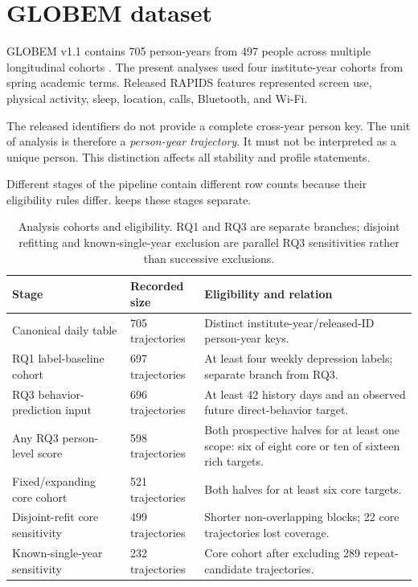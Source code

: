 \documentclass[a4paper,11pt,oneside]{report}
\begin{document}
\section{GLOBEM dataset}

GLOBEM v1.1 contains 705 person-years from 497 people across multiple longitudinal
cohorts \citep{xu2022globem}. The present analyses used four institute-year cohorts
from spring academic terms. Released RAPIDS features represented screen use,
physical activity, sleep, location, calls, Bluetooth, and Wi-Fi.

The released identifiers do not provide a complete cross-year person key. The unit
of analysis is therefore a \emph{person-year trajectory}. It must not be interpreted
as a unique person. This distinction affects all stability and profile statements.

Different stages of the pipeline contain different row counts because their
eligibility rules differ.  keeps these stages separate.

\begin{table}[H]
\centering
\caption[Analysis cohorts and eligibility]{Analysis cohorts and eligibility. RQ1
and RQ3 are separate branches; disjoint refitting and known-single-year exclusion
are parallel RQ3 sensitivities rather than successive exclusions.}
\label{tab:samples}
\begin{tabularx}{\textwidth}{@{}L{0.29\textwidth}L{0.17\textwidth}Y@{}}
\toprule
Stage & Recorded size & Eligibility and relation \\
\midrule
Canonical daily table & 705 trajectories & Distinct institute-year/released-ID
person-year keys. \\
RQ1 label-baseline cohort & 697 trajectories & At least four weekly depression
labels; separate branch from RQ3. \\
RQ3 behavior-prediction input & 696 trajectories & At least 42 history days and an
observed future direct-behavior target. \\
Any RQ3 person-level score & 598 trajectories & Both prospective halves for at least
one scope: six of eight core or ten of sixteen rich targets. \\
Fixed/expanding core cohort & 521 trajectories & Both halves for at least six core
targets. \\
Disjoint-refit core sensitivity & 499 trajectories & Shorter non-overlapping blocks;
22 core trajectories lost coverage. \\
Known-single-year sensitivity & 232 trajectories & Core cohort after excluding 289
repeat-candidate trajectories. \\
\bottomrule
\end{tabularx}
\end{table}
\end{document}
